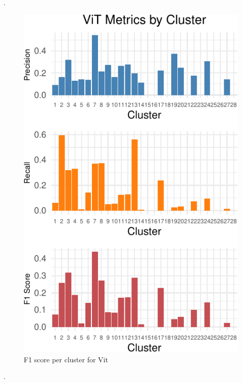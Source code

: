 \documentclass[letterpaper,9pt,twocolumn,twoside,]{pinp}
\begin{document}
\vspace{10 cm}

.

\begin{figure}[h]

{\centering \includegraphics{Image02_final_report_files/figure-latex/unnamed-chunk-9-1} 

}

\caption{F1 score per cluster for Vit}\label{fig:unnamed-chunk-9}
\end{figure}

\vspace{10 cm}

.
\end{document}
